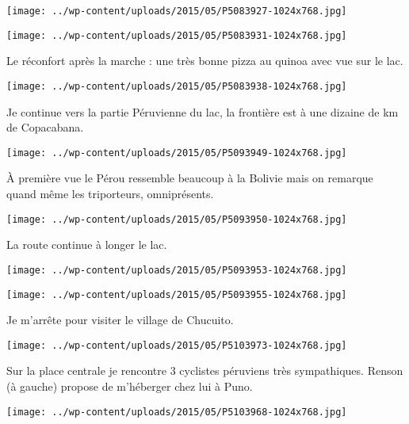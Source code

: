  \newline
 \newline
\centerline{\texttt{[image: ../wp-content/uploads/2015/05/P5083927-1024x768.jpg]} } 
 \newline
 \newline
\centerline{\texttt{[image: ../wp-content/uploads/2015/05/P5083931-1024x768.jpg]} } 
 \newline
 Le réconfort après la marche : une très bonne pizza au quinoa avec vue sur le lac. \newline
 \newline
\centerline{\texttt{[image: ../wp-content/uploads/2015/05/P5083938-1024x768.jpg]} } 
 \newline
 Je continue vers la partie Péruvienne du lac, la frontière est à une dizaine de km de Copacabana. \newline
 \newline
\centerline{\texttt{[image: ../wp-content/uploads/2015/05/P5093949-1024x768.jpg]} } 
 \newline
 À première vue le Pérou ressemble beaucoup à la Bolivie mais on remarque quand même les triporteurs, omniprésents. \newline
 \newline
\centerline{\texttt{[image: ../wp-content/uploads/2015/05/P5093950-1024x768.jpg]} } 
 \newline
 La route continue à longer le lac. \newline
 \newline
\centerline{\texttt{[image: ../wp-content/uploads/2015/05/P5093953-1024x768.jpg]} } 
 \newline
 \newline
\centerline{\texttt{[image: ../wp-content/uploads/2015/05/P5093955-1024x768.jpg]} } 
 \newline
 Je m'arrête pour visiter le village de Chucuito. \newline
 \newline
\centerline{\texttt{[image: ../wp-content/uploads/2015/05/P5103973-1024x768.jpg]} } 
 \newline
 Sur la place centrale je rencontre 3 cyclistes péruviens très sympathiques. Renson (à gauche) propose de m'héberger chez lui à Puno. \newline
 \newline
\centerline{\texttt{[image: ../wp-content/uploads/2015/05/P5103968-1024x768.jpg]} } 
